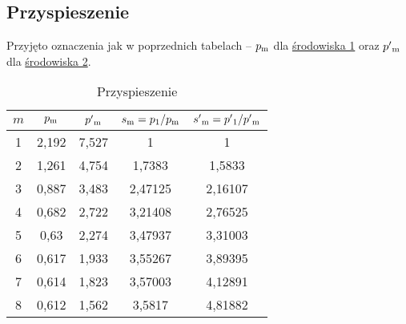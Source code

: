 \documentclass{article}
\begin{document}
    \subsection{Przyspieszenie}
    Przyjęto oznaczenia jak w poprzednich tabelach -- $p\textsubscript{m}$ dla
    \hyperref[test:first]{środowiska 1} oraz $p'\textsubscript{m}$ dla
    \hyperref[test:second]{środowiska 2}.
    \begin{table}[h]
      \centering
      \label{tab:speedup}
      \begin{tabular}{|c|c|c|c|c|}
        \hline
        \bfseries $m$ & \bfseries $p\textsubscript{m}$ & \bfseries $p'\textsubscript{m}$
        & \bfseries $s\textsubscript{m} = p\textsubscript{1}/p\textsubscript{m}$
        & \bfseries $s'\textsubscript{m} = p'\textsubscript{1}/p'\textsubscript{m}$ \\
        \hline
        1 & 2,192 & 7,527 & 1       & 1       \\
        2 & 1,261 & 4,754 & 1,7383  & 1,5833  \\
        3 & 0,887 & 3,483 & 2,47125 & 2,16107 \\
        4 & 0,682 & 2,722 & 3,21408 & 2,76525 \\
        5 & 0,63  & 2,274 & 3,47937 & 3,31003 \\
        6 & 0,617 & 1,933 & 3,55267 & 3,89395 \\
        7 & 0,614 & 1,823 & 3,57003 & 4,12891 \\
        8 & 0,612 & 1,562 & 3,5817  & 4,81882 \\
        \hline
      \end{tabular}
      \caption{Przyspieszenie}
    \end{table}
\end{document}
